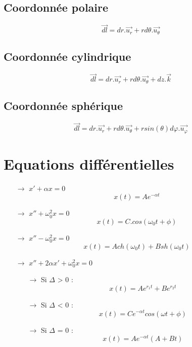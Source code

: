\subsection{Coordonnée polaire}
$$\overrightarrow{dl} = dr.\overrightarrow{u_r}+rd\theta.\overrightarrow{u_{\theta}}$$
\subsection{Coordonnée cylindrique}
$$\overrightarrow{dl} = dr.\overrightarrow{u_r}+rd\theta.\overrightarrow{u_{\theta}}+dz.\overrightarrow{k}$$
\subsection{Coordonnée sphérique}
$$\overrightarrow{dl} = dr.\overrightarrow{u_r}+rd\theta.\overrightarrow{u_{\theta}}+rsin(\theta)d\varphi.\overrightarrow{u_{\varphi}}$$
\section{Equations différentielles}
\begin{itemize}
 \item[$\rightarrow$] $x'+\alpha x=0$ $$x(t) = Ae^{-\alpha t}$$
 \item[$\rightarrow$] $x'' + \omega_0^2x = 0$ $$x(t) = C.cos(\omega_0t+\phi)$$
 \item[$\rightarrow$] $x'' - \omega_0^2x = 0$ $$x(t) =  Ach(\omega_0t)+Bsh(\omega_0t)$$
 \item[$\rightarrow$] $x'' + 2\alpha x'+\omega_0^2x = 0$ 
\begin{itemize}
 \item[$\rightarrow$] Si $\Delta$ > 0 : $$x(t) = Ae^{r_1t} + Be^{r_2t}$$
 \item[$\rightarrow$] Si $\Delta$ < 0 : $$x(t) = Ce^{-\alpha t}cos(\omega t+\phi)$$ 
 \item[$\rightarrow$] Si $\Delta$ = 0 : $$x(t) = Ae^{- \alpha t}(A+Bt)$$
\end{itemize}
\end{itemize}
